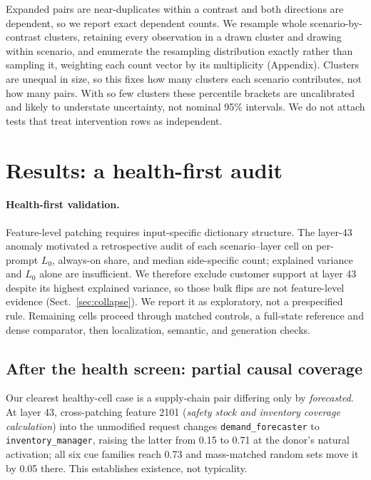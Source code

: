 \documentclass{article}
\begin{document}
Expanded pairs are near-duplicates within a contrast and both directions are
dependent, so we report exact dependent counts. We resample whole
scenario-by-contrast clusters, retaining every observation in a drawn cluster
and drawing within scenario, and enumerate the resampling distribution exactly
rather than sampling it, weighting each count vector by its multiplicity
(Appendix). Clusters are unequal in size, so this fixes how many clusters each
scenario contributes, not how many pairs. With so few clusters these percentile
brackets are
uncalibrated and likely to understate uncertainty, not nominal 95\%
intervals. We do not attach tests that treat intervention rows as independent.

\section{Results: a health-first audit}
\label{sec:results}

\paragraph{Health-first validation.}
Feature-level patching requires input-specific dictionary structure. The
layer-43 anomaly motivated a retrospective audit of each scenario--layer cell
on per-prompt $L_0$, always-on share, and median side-specific count; explained
variance and $L_0$ alone are insufficient. We therefore exclude customer support at layer
43 despite its highest explained variance, so those bulk flips are not
feature-level evidence (Sect.~\ref{sec:collapse}). We report it as exploratory, not a
prespecified rule. Remaining cells proceed through matched controls, a
full-state reference and dense comparator, then localization, semantic, and
generation checks.

\subsection{After the health screen: partial causal coverage}
\label{sec:coverage}

Our clearest healthy-cell case is a supply-chain pair differing only by \emph{forecasted}. At layer 43,
cross-patching feature 2101 (\emph{safety stock and inventory coverage
calculation}) into the unmodified request changes \texttt{demand\_forecaster}
to \texttt{inventory\_manager}, raising the latter from 0.15 to 0.71 at the
donor's natural activation; all six cue families reach 0.73 and mass-matched
random sets move it by 0.05 there. This establishes existence, not typicality.
\end{document}
